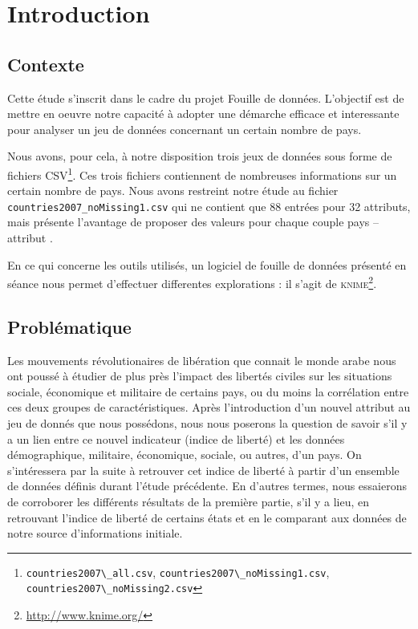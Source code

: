 \section{Introduction}

\subsection{Contexte}
Cette étude s'inscrit dans le cadre du projet Fouille de données. L'objectif est de mettre en oeuvre notre capacité à adopter une démarche efficace et interessante pour analyser un jeu de données concernant un certain nombre de pays.

Nous avons, pour cela, à notre disposition trois jeux de données sous forme de fichiers CSV\footnote{\verb!countries2007\_all.csv!, \verb!countries2007\_noMissing1.csv!, \verb!countries2007\_noMissing2.csv!}. Ces trois fichiers contiennent de nombreuses informations sur un certain nombre de pays. Nous avons restreint notre étude au fichier \verb!countries2007_noMissing1.csv! qui ne contient que 88 entrées pour 32 attributs, mais présente l'avantage de proposer des valeurs pour chaque couple \og pays -- attribut \fg.

En ce qui concerne les outils utilisés, un logiciel de fouille de données présenté en séance nous permet d'effectuer differentes explorations : il s'agit de \textsc{knime}\footnote{\url{http://www.knime.org/}}. 

\subsection{Problématique}

Les mouvements révolutionaires de libération que connait le monde arabe nous ont poussé à étudier de plus près l'impact des libertés civiles sur les situations sociale, économique et militaire de certains pays, ou du moins la corrélation entre ces deux groupes de caractéristiques.
Après l'introduction d'un nouvel attribut au jeu de donnés que nous possédons, nous nous poserons la question de savoir s'il y a un lien entre ce nouvel indicateur (indice de liberté) et les données démographique, militaire, économique, sociale, ou autres, d'un pays.
On s'intéressera par la suite à retrouver cet indice de liberté à partir d'un ensemble de données définis durant l'étude précédente. En d'autres termes, nous essaierons de corroborer les différents résultats de la première partie, s'il y a lieu, en retrouvant l'indice de liberté de certains états et en le comparant aux données de notre source d'informations initiale.



